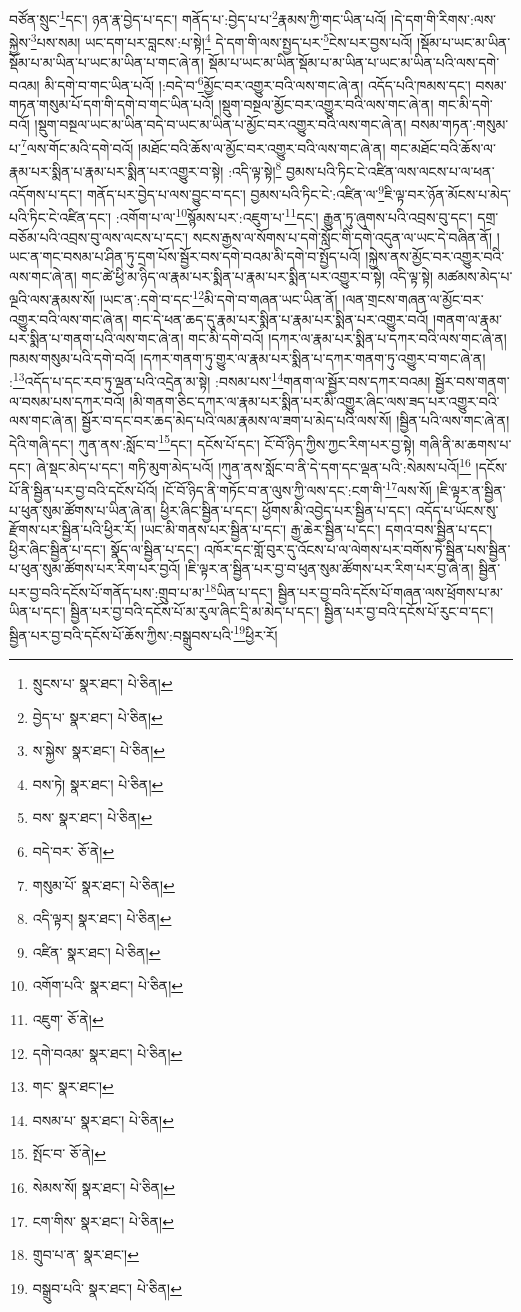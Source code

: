 བཙོན་སྲུང་\footnote{སྲུངས་པ་  སྣར་ཐང་།  པེ་ཅིན། }དང་། ཉན་རྣ་བྱེད་པ་དང་། གནོད་པ་:བྱེད་པ་པ་\footnote{བྱེད་པ་  སྣར་ཐང་།  པེ་ཅིན། }རྣམས་ཀྱི་གང་ཡིན་པའོ། །དེ་དག་གི་རིགས་:ལས་སྐྱེས་\footnote{ས་སྐྱེས་  སྣར་ཐང་།  པེ་ཅིན། }པས་སམ། ཡང་དག་པར་བླངས་:པ་སྟེ།\footnote{བས་ཏེ།  སྣར་ཐང་།  པེ་ཅིན། } དེ་དག་གི་ལས་སྤྱད་པར་\footnote{བས་  སྣར་ཐང་།  པེ་ཅིན། }ངེས་པར་བྱས་པའོ། །སྡོམ་པ་ཡང་མ་ཡིན་སྡོམ་པ་མ་ཡིན་པ་ཡང་མ་ཡིན་པ་གང་ཞེ་ན། སྡོམ་པ་ཡང་མ་ཡིན་སྡོམ་པ་མ་ཡིན་པ་ཡང་མ་ཡིན་པའི་ལས་དགེ་བའམ། མི་དགེ་བ་གང་ཡིན་པའོ། །:བདེ་བ་\footnote{བདེ་བར་  ཅོ་ནེ། }མྱོང་བར་འགྱུར་བའི་ལས་གང་ཞེ་ན། འདོད་པའི་ཁམས་དང་། བསམ་གཏན་གསུམ་པོ་དག་གི་དགེ་བ་གང་ཡིན་པའོ། །སྡུག་བསྔལ་མྱོང་བར་འགྱུར་བའི་ལས་གང་ཞེ་ན། གང་མི་དགེ་བའོ། །སྡུག་བསྔལ་ཡང་མ་ཡིན་བདེ་བ་ཡང་མ་ཡིན་པ་མྱོང་བར་འགྱུར་བའི་ལས་གང་ཞེ་ན། བསམ་གཏན་:གསུམ་པ་\footnote{གསུམ་པོ་  སྣར་ཐང་།  པེ་ཅིན། }ལས་གོང་མའི་དགེ་བའོ། །མཐོང་བའི་ཆོས་ལ་མྱོང་བར་འགྱུར་བའི་ལས་གང་ཞེ་ན། གང་མཐོང་བའི་ཆོས་ལ་རྣམ་པར་སྨིན་པ་རྣམ་པར་སྨིན་པར་འགྱུར་བ་སྟེ། :འདི་ལྟ་སྟེ།\footnote{འདི་ལྟར།  སྣར་ཐང་།  པེ་ཅིན། } བྱམས་པའི་ཏིང་ངེ་འཛིན་ལས་ལངས་པ་ལ་ཕན་འདོགས་པ་དང་། གནོད་པར་བྱེད་པ་ལས་བྱུང་བ་དང་། བྱམས་པའི་ཏིང་ངེ་:འཛིན་ལ་\footnote{འཛིན་  སྣར་ཐང་།  པེ་ཅིན། }ཇི་ལྟ་བར་ཉོན་མོངས་པ་མེད་པའི་ཏིང་ངེ་འཛིན་དང་། :འགོག་པ་ལ་\footnote{འགོག་པའི་  སྣར་ཐང་།  པེ་ཅིན། }སྙོམས་པར་:འཇུག་པ་\footnote{འཇུག་  ཅོ་ནེ། }དང་། རྒྱུན་ཏུ་ཞུགས་པའི་འབྲས་བུ་དང་། དགྲ་བཅོམ་པའི་འབྲས་བུ་ལས་ལངས་པ་དང་། སངས་རྒྱས་ལ་སོགས་པ་དགེ་སློང་གི་དགེ་འདུན་ལ་ཡང་དེ་བཞིན་ནོ། །ཡང་ན་གང་བསམ་པ་ཤིན་ཏུ་དྲག་པོས་སྦྱོར་བས་དགེ་བའམ་མི་དགེ་བ་སྤྱོད་པའོ། །སྐྱེས་ནས་མྱོང་བར་འགྱུར་བའི་ལས་གང་ཞེ་ན། གང་ཚེ་ཕྱི་མ་ཉིད་ལ་རྣམ་པར་སྨིན་པ་རྣམ་པར་སྨིན་པར་འགྱུར་བ་སྟེ། འདི་ལྟ་སྟེ། མཚམས་མེད་པ་ལྔའི་ལས་རྣམས་སོ། །ཡང་ན་:དགེ་བ་དང་\footnote{དགེ་བའམ་  སྣར་ཐང་།  པེ་ཅིན། }མི་དགེ་བ་གཞན་ཡང་ཡིན་ནོ། །ལན་གྲངས་གཞན་ལ་མྱོང་བར་འགྱུར་བའི་ལས་གང་ཞེ་ན། གང་དེ་ཕན་ཆད་དུ་རྣམ་པར་སྨིན་པ་རྣམ་པར་སྨིན་པར་འགྱུར་བའོ། །གནག་ལ་རྣམ་པར་སྨིན་པ་གནག་པའི་ལས་གང་ཞེ་ན། གང་མི་དགེ་བའོ། །དཀར་ལ་རྣམ་པར་སྨིན་པ་དཀར་བའི་ལས་གང་ཞེ་ན། ཁམས་གསུམ་པའི་དགེ་བའོ། །དཀར་གནག་ཏུ་གྱུར་ལ་རྣམ་པར་སྨིན་པ་དཀར་གནག་ཏུ་འགྱུར་བ་གང་ཞེ་ན། :\footnote{གང་  སྣར་ཐང་། }འདོད་པ་དང་རབ་ཏུ་ལྡན་པའི་འདྲེན་མ་སྟེ། :བསམ་པས་\footnote{བསམ་པ་  སྣར་ཐང་།  པེ་ཅིན། }གནག་ལ་སྦྱོར་བས་དཀར་བའམ། སྦྱོར་བས་གནག་ལ་བསམ་པས་དཀར་བའོ། །མི་གནག་ཅིང་དཀར་ལ་རྣམ་པར་སྨིན་པར་མི་འགྱུར་ཞིང་ལས་ཟད་པར་འགྱུར་བའི་ལས་གང་ཞེ་ན། སྦྱོར་བ་དང་བར་ཆད་མེད་པའི་ལམ་རྣམས་ལ་ཟག་པ་མེད་པའི་ལས་སོ། །སྦྱིན་པའི་ལས་གང་ཞེ་ན། དེའི་གཞི་དང་། ཀུན་ནས་:སློང་བ་\footnote{སྤོང་བ་  ཅོ་ནེ། }དང་། དངོས་པོ་དང་། ངོ་བོ་ཉིད་ཀྱིས་ཀྱང་རིག་པར་བྱ་སྟེ། གཞི་ནི་མ་ཆགས་པ་དང་། ཞེ་སྡང་མེད་པ་དང་། གཏི་མུག་མེད་པའོ། །ཀུན་ནས་སློང་བ་ནི་དེ་དག་དང་ལྡན་པའི་:སེམས་པའོ།\footnote{སེམས་སོ།  སྣར་ཐང་།  པེ་ཅིན། } །དངོས་པོ་ནི་སྦྱིན་པར་བྱ་བའི་དངོས་པོའོ། །ངོ་བོ་ཉིད་ནི་གཏོང་བ་ན་ལུས་ཀྱི་ལས་དང་:ངག་གི་\footnote{ངག་གིས་  སྣར་ཐང་།  པེ་ཅིན། }ལས་སོ། །ཇི་ལྟར་ན་སྦྱིན་པ་ཕུན་སུམ་ཚོགས་པ་ཡིན་ཞེ་ན། ཕྱིར་ཞིང་སྦྱིན་པ་དང་། ཕྱོགས་མི་འབྱེད་པར་སྦྱིན་པ་དང་། འདོད་པ་ཡོངས་སུ་རྫོགས་པར་སྦྱིན་པའི་ཕྱིར་རོ། །ཡང་མི་གནས་པར་སྦྱིན་པ་དང་། རྒྱ་ཆེར་སྦྱིན་པ་དང་། དགའ་བས་སྦྱིན་པ་དང་། ཕྱིར་ཞིང་སྦྱིན་པ་དང་། སྣོད་ལ་སྦྱིན་པ་དང་། འཁོར་དང་གློ་བུར་དུ་འོངས་པ་ལ་ལེགས་པར་བགོས་ཏེ་སྦྱིན་པས་སྦྱིན་པ་ཕུན་སུམ་ཚོགས་པར་རིག་པར་བྱའོ། །ཇི་ལྟར་ན་སྦྱིན་པར་བྱ་བ་ཕུན་སུམ་ཚོགས་པར་རིག་པར་བྱ་ཞེ་ན། སྦྱིན་པར་བྱ་བའི་དངོས་པོ་གནོད་པས་:གྲུབ་པ་མ་\footnote{གྲུབ་པ་ན་  སྣར་ཐང་། }ཡིན་པ་དང་། སྦྱིན་པར་བྱ་བའི་དངོས་པོ་གཞན་ལས་ཕྲོགས་པ་མ་ཡིན་པ་དང་། སྦྱིན་པར་བྱ་བའི་དངོས་པོ་མ་རུལ་ཞིང་དྲི་མ་མེད་པ་དང་། སྦྱིན་པར་བྱ་བའི་དངོས་པོ་རུང་བ་དང་། སྦྱིན་པར་བྱ་བའི་དངོས་པོ་ཆོས་ཀྱིས་:བསྒྲུབས་པའི་\footnote{བསྒྲུབ་པའི་  སྣར་ཐང་།  པེ་ཅིན། }ཕྱིར་རོ། 